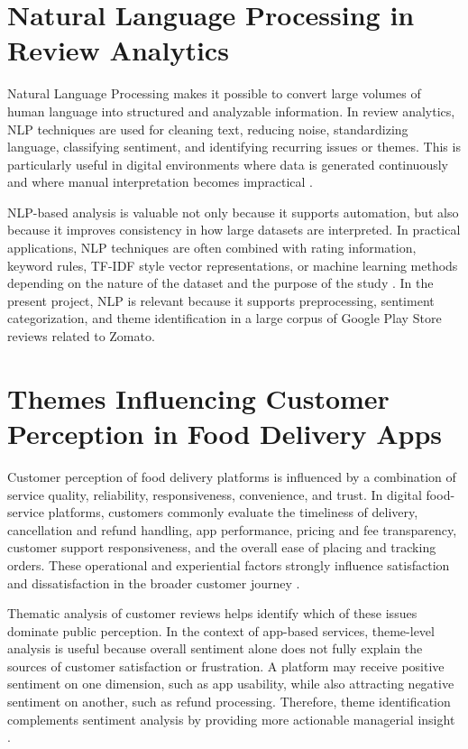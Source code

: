 \section{Natural Language Processing in Review Analytics}

Natural Language Processing makes it possible to convert large volumes of human language into structured and analyzable information. In review analytics, NLP techniques are used for cleaning text, reducing noise, standardizing language, classifying sentiment, and identifying recurring issues or themes. This is particularly useful in digital environments where data is generated continuously and where manual interpretation becomes impractical \cite{manning1999,jurafsky2024}.

NLP-based analysis is valuable not only because it supports automation, but also because it improves consistency in how large datasets are interpreted. In practical applications, NLP techniques are often combined with rating information, keyword rules, TF-IDF style vector representations, or machine learning methods depending on the nature of the dataset and the purpose of the study \cite{salton1988,hosmer2013}. In the present project, NLP is relevant because it supports preprocessing, sentiment categorization, and theme identification in a large corpus of Google Play Store reviews related to Zomato.

\section{Themes Influencing Customer Perception in Food Delivery Apps}

Customer perception of food delivery platforms is influenced by a combination of service quality, reliability, responsiveness, convenience, and trust. In digital food-service platforms, customers commonly evaluate the timeliness of delivery, cancellation and refund handling, app performance, pricing and fee transparency, customer support responsiveness, and the overall ease of placing and tracking orders. These operational and experiential factors strongly influence satisfaction and dissatisfaction in the broader customer journey \cite{lemon2016,verhoef2010}.

Thematic analysis of customer reviews helps identify which of these issues dominate public perception. In the context of app-based services, theme-level analysis is useful because overall sentiment alone does not fully explain the sources of customer satisfaction or frustration. A platform may receive positive sentiment on one dimension, such as app usability, while also attracting negative sentiment on another, such as refund processing. Therefore, theme identification complements sentiment analysis by providing more actionable managerial insight \cite{filieri2015,lemon2016}.


